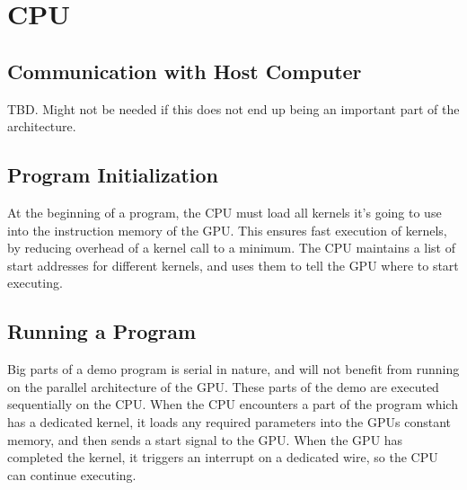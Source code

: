 \documentclass[../main/report.tex]{subfiles}
\begin{document}
\chapter{CPU}



\section{Communication with Host Computer}
TBD. Might not be needed if this does not end up being an important part of the architecture.



\section{Program Initialization}
At the beginning of a program, the CPU must load all kernels it's going to use into the instruction memory of the GPU. This ensures fast execution of kernels, by reducing overhead of a kernel call to a minimum.
The CPU maintains a list of start addresses for different kernels, and uses them to tell the GPU where to start executing.

\section{Running a Program}
Big parts of a demo program is serial in nature, and will not benefit from running on the parallel architecture of the GPU.
These parts of the demo are executed sequentially on the CPU.
When the CPU encounters a part of the program which has a dedicated kernel,
it loads any required parameters into the GPUs constant memory, and then sends a start signal to the GPU.
When the GPU has completed the kernel, it triggers an interrupt on a dedicated wire,
so the CPU can continue executing.
\end{document}
